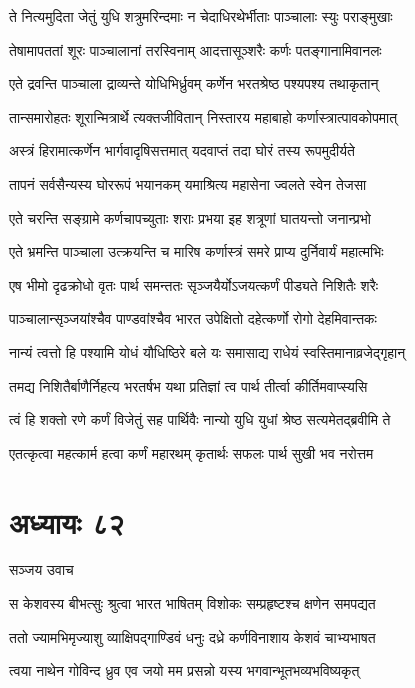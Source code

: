 \twolineshloka
{ते नित्यमुदिता जेतुं युधि शत्रुमरिन्दमाः}
{न चेदाधिरथेर्भीताः पाञ्चालाः स्युः पराङ्मुखाः}


\twolineshloka
{तेषामापततां शूरः पाञ्चालानां तरस्विनाम्}
{आदत्तासूञ्शरैः कर्णः पतङ्गानामिवानलः}


\twolineshloka
{एते द्रवन्ति पाञ्चाला द्राव्यन्ते योधिभिर्ध्रुवम्}
{कर्णेन भरतश्रेष्ठ पश्यपश्य तथाकृतान्}


\twolineshloka
{तान्समारोहतः शूरान्मित्रार्थे त्यक्तजीवितान्}
{निस्तारय महाबाहो कर्णास्त्रात्पावकोपमात्}


\twolineshloka
{अस्त्रं हिरामात्कर्णेन भार्गवादृषिसत्तमात्}
{यदवाप्तं तदा घोरं तस्य रूपमुदीर्यते}


\twolineshloka
{तापनं सर्वसैन्यस्य घोररूपं भयानकम्}
{यमाश्रित्य महासेना ज्वलते स्वेन तेजसा}


\twolineshloka
{एते चरन्ति सङ्ग्रामे कर्णचापच्युताः शराः}
{प्रभया इह शत्रूणां घातयन्तो जनान्प्रभो}


\twolineshloka
{एते भ्रमन्ति पाञ्चाला उत्क्रयन्ति च मारिष}
{कर्णास्त्रं समरे प्राप्य दुर्निवार्यं महात्मभिः}


\twolineshloka
{एष भीमो दृढक्रोधो वृतः पार्थ समन्ततः}
{सृञ्जयैर्योऽजयत्कर्णं पीड्यते निशितैः शरैः}


\twolineshloka
{पाञ्चालान्सृञ्जयांश्चैव पाण्डवांश्चैव भारत}
{उपेक्षितो दहेत्कर्णो रोगो देहमिवान्तकः}


\twolineshloka
{नान्यं त्वत्तो हि पश्यामि योधं यौधिष्ठिरे बले}
{यः समासाद्य राधेयं स्वस्तिमानाव्रजेद्गृहान्}


\twolineshloka
{तमद्य निशितैर्बाणैर्निहत्य भरतर्षभ}
{यथा प्रतिज्ञां त्व पार्थ तीर्त्वा कीर्तिमवाप्स्यसि}


\twolineshloka
{त्वं हि शक्तो रणे कर्णं विजेतुं सह पार्थिवैः}
{नान्यो युधि युधां श्रेष्ठ सत्यमेतद्ब्रवीमि ते}


\twolineshloka
{एतत्कृत्वा महत्कार्म हत्वा कर्णं महारथम्}
{कृतार्थः सफलः पार्थ सुखी भव नरोत्तम}


\chapter{अध्यायः ८२}
\twolineshloka
{सञ्जय उवाच}
{}


\twolineshloka
{स केशवस्य बीभत्सुः श्रुत्वा भारत भाषितम्}
{विशोकः सम्प्रहृष्टश्च क्षणेन समपद्यत}


\twolineshloka
{ततो ज्यामभिमृज्याशु व्याक्षिपद्गाण्डिवं धनुः}
{दध्रे कर्णविनाशाय केशवं चाभ्यभाषत}


\twolineshloka
{त्वया नाथेन गोविन्द ध्रुव एव जयो मम}
{प्रसन्नो यस्य भगवान्भूतभव्यभविष्यकृत्}


